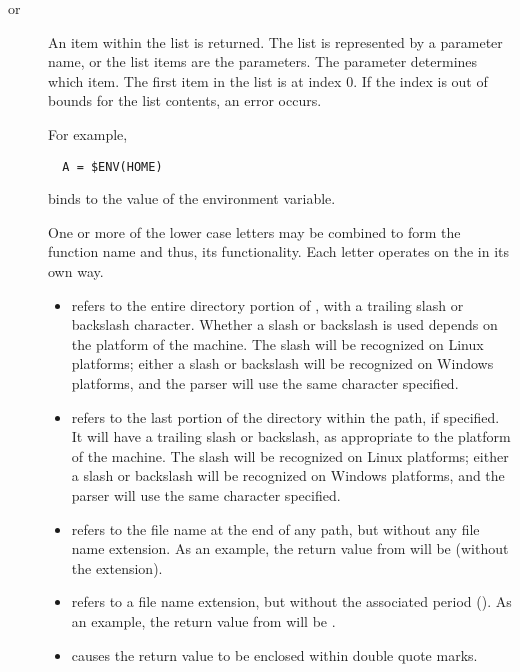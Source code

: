 \begin{description}

\item [ 
       or ]
An item within the list is returned.
The list is represented by a parameter name,
or the list items are the parameters.
The  parameter determines which item.
The first item in the list is at index 0.
If the index is out of bounds for the list contents, 
an error occurs.


\item []
For example, 
\begin{verbatim}
  A = $ENV(HOME)
\end{verbatim}
binds  to the value of the  environment variable.

\item []
One or more of the lower case letters may be combined to form the
function name and thus, its functionality.
Each letter operates on the  in its own way.
\begin{itemize}
  \item {} refers to the entire directory portion of ,
with a trailing slash or backslash character.
Whether a slash or backslash is used depends on the platform of
the machine.
The slash will be recognized on Linux platforms;
either a slash or backslash will be recognized on Windows platforms,
and the parser will use the same character specified.
  \item {} refers to the last portion of the directory within the path,
if specified.
It will have a trailing slash or backslash, 
as appropriate to the platform of the machine.
The slash will be recognized on Linux platforms;
either a slash or backslash will be recognized on Windows platforms,
and the parser will use the same character specified.
  \item {} refers to the file name at the end of any path,
but without any file name extension.
As an  example, the return value from 
will be  (without the  extension).
  \item {} refers to a file name extension, but without the associated
period ().
As an  example, the return value from 
will be .
  \item {} causes the return value to be enclosed within double
quote marks.
\end{itemize}



\end{description}
